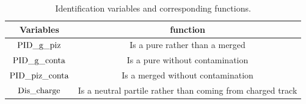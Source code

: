 \begin{table}[!btp]
\centering
\caption{Identification variables and corresponding functions.}
\vspace{0.2cm}
\label{tab:identify}
\begin{tabular}{c | c }\hline\hline
Variables  					& function \\\hline
${\rm PID\_g\_piz}$   		& Is a pure \g rather than a merged \piz  \\
${\rm PID\_g\_conta}$    	& Is a pure \g without contamination\\
${\rm PID\_piz\_conta}$  	& Is a merged \piz without contamination\\
\hline
${\rm Dis\_charge}$   			& Is a neutral partile rather than coming from charged track \\
\hline\hline
\end{tabular}
\end{table}






